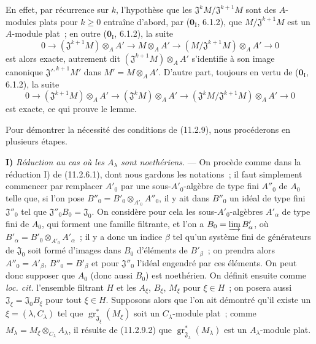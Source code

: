 
En effet, par récurrence sur $k$, l'hypothèse que les
$\mathfrak J^kM/\mathfrak J^{k+1}M$ sont des $A$-modules plats pour $k\geq0$
entraîne d'abord, par ($\mathbf 0_{\mathrm I}$, 6.1.2), que
$M/\mathfrak J^{k+1}M$ est un $A$-module plat~; en outre
($\mathbf 0_{\mathrm I}$, 6.1.2), la suite
\[
0\longrightarrow(\mathfrak J^{k+1}M)\otimes_AA'
\longrightarrow M\otimes_AA'
\longrightarrow(M/\mathfrak J^{k+1}M)\otimes_AA'\longrightarrow0
\]
est alors exacte, autrement dit $(\mathfrak J^{k+1}M)\otimes_AA'$ s'identifie
à son image canonique $\mathfrak J'^{,k+1}M'$ dans $M'=M\otimes_AA'$.
D'autre part, toujours en vertu de ($\mathbf 0_{\mathrm I}$, 6.1.2), la suite
\[
0\longrightarrow(\mathfrak J^{k+1}M)\otimes_AA'
\longrightarrow(\mathfrak J^kM)\otimes_AA'
\longrightarrow(\mathfrak J^kM/\mathfrak J^{k+1}M)\otimes_AA'
\longrightarrow0
\]
est exacte, ce qui prouve le lemme.

Pour démontrer la nécessité des conditions de (11.2.9), nous procéderons en
plusieurs étapes.

\medskip
\noindent\textbf{I)} \emph{Réduction au cas où les $A_\lambda$ sont
noethériens.} --- On procède comme dans la réduction I) de (11.2.6.1), dont
nous gardons les notations~; il faut simplement commencer par remplacer
$A'_0$ par une sous-$A'_0$-algèbre de type fini $A''_0$ de $A_0$ telle que,
si l'on pose $B''_0=B'_0\otimes_{A'_0}A''_0$, il y ait dans $B''_0$ un idéal
de type fini $\mathfrak J''_0$ tel que $\mathfrak J''_0B_0=\mathfrak J_0$.
On considère pour cela les sous-$A'_0$-algèbres $A'_\alpha$ de type fini de
$A_0$, qui forment une famille filtrante, et l'on a
$B_0=\varinjlim B'_\alpha$, où
$B'_\alpha=B'_0\otimes_{A'_0}A'_\alpha$~; il y a donc un indice $\beta$ tel
qu'un système fini de générateurs de $\mathfrak J_0$ soit formé d'images dans
$B_0$ d'éléments de $B'_\beta$~; on prendra alors $A''_0=A'_\beta$,
$B''_0=B'_\beta$ et pour $\mathfrak J''_0$ l'idéal engendré par ces éléments.
On peut donc supposer que $A_0$ (donc aussi $B_0$) est noethérien. On définit
ensuite comme \emph{loc. cit.} l'ensemble filtrant $H$ et les $A_\xi$,
$B_\xi$, $M_\xi$ pour $\xi\in H$~; on posera aussi
$\mathfrak J_\xi=\mathfrak J_0B_\xi$ pour tout $\xi\in H$. Supposons alors
que l'on ait démontré qu'il existe un $\xi=(\lambda,C_\lambda)$ tel que
$\operatorname{gr}_{\mathfrak J_\xi}^*(M_\xi)$ soit un $C_\lambda$-module
plat~; comme $M_\lambda=M_\xi\otimes_{C_\lambda}A_\lambda$, il résulte de
(11.2.9.2) que $\operatorname{gr}_{\mathfrak J_\lambda}^*(M_\lambda)$ est un
$A_\lambda$-module plat.

